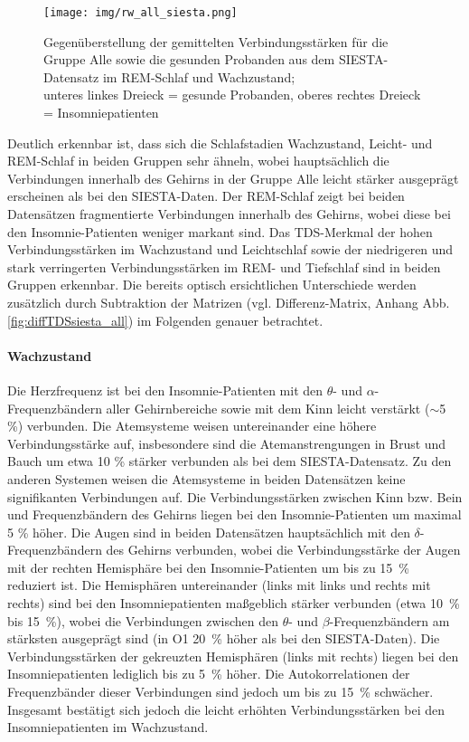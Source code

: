 \begin{figure}[H]
	\centering
	\texttt{[image: img/rw\_all\_siesta.png]}
	\caption[Verbindungsstärken für die Gruppe Alle und den SIESTA-Datensatz im \acs{REM}-Schlaf und Wachzustand]{Gegenüberstellung der gemittelten Verbindungsstärken für die Gruppe Alle sowie die gesunden Probanden aus dem SIESTA-Datensatz im \acs{REM}-Schlaf und Wachzustand;\\unteres linkes Dreieck = gesunde Probanden, oberes rechtes Dreieck = Insomniepatienten}
	\label{fig:rw_all_siesta}
\end{figure}

\newpage

Deutlich erkennbar ist, dass sich die Schlafstadien Wachzustand, Leicht- und \acs{REM}-Schlaf in beiden Gruppen sehr ähneln, wobei hauptsächlich die Verbindungen innerhalb des Gehirns in der Gruppe Alle leicht stärker ausgeprägt erscheinen als bei den SIESTA-Daten. Der \acs{REM}-Schlaf zeigt bei beiden Datensätzen fragmentierte Verbindungen innerhalb des Gehirns, wobei diese bei den Insomnie-Patienten weniger markant sind. Das \acs{TDS}-Merkmal der hohen Verbindungsstärken im Wachzustand und Leichtschlaf sowie der niedrigeren und stark verringerten Verbindungsstärken im \acs{REM}- und Tiefschlaf sind in beiden Gruppen erkennbar. Die bereits optisch ersichtlichen Unterschiede werden zusätzlich durch Subtraktion der Matrizen (vgl. Differenz-Matrix, Anhang Abb. \ref{fig:diffTDSsiesta_all}) im Folgenden genauer betrachtet.

\paragraph{Wachzustand} Die Herzfrequenz ist bei den Insomnie-Patienten mit den $\theta$- und $\alpha$-Frequenzbändern aller Gehirnbereiche sowie mit dem Kinn leicht verstärkt ($\sim$5 \%) verbunden. Die Atemsysteme weisen untereinander eine höhere Verbindungsstärke auf, insbesondere sind die Atemanstrengungen in Brust und Bauch um etwa 10 \% stärker verbunden als bei dem SIESTA-Datensatz. Zu den anderen Systemen weisen die Atemsysteme in beiden Datensätzen keine signifikanten Verbindungen auf. Die Verbindungsstärken zwischen Kinn bzw. Bein und Frequenzbändern des Gehirns liegen bei den Insomnie-Patienten um maximal 5 \% höher. Die Augen sind in beiden Datensätzen hauptsächlich mit den $\delta$-Frequenzbändern des Gehirns verbunden, wobei die Verbindungsstärke der Augen mit der rechten Hemisphäre bei den Insomnie-Patienten um bis zu 15~\% reduziert ist. Die Hemisphären untereinander (links mit links und rechts mit rechts) sind bei den Insomniepatienten maßgeblich stärker verbunden (etwa 10~\% bis 15~\%), wobei die Verbindungen zwischen den $\theta$- und $\beta$-Frequenzbändern am stärksten ausgeprägt sind (in O1 20~\% höher als bei den SIESTA-Daten). Die Verbindungsstärken der gekreuzten Hemisphären (links mit rechts) liegen bei den Insomniepatienten lediglich bis zu 5~\% höher. Die Autokorrelationen der Frequenzbänder dieser Verbindungen sind jedoch um bis zu 15~\% schwächer. Insgesamt bestätigt sich jedoch die leicht erhöhten Verbindungsstärken bei den Insomniepatienten im Wachzustand. 

